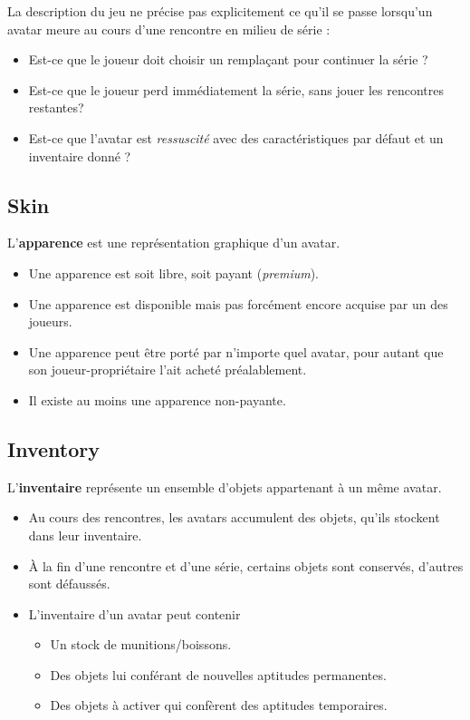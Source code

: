 \begin{tcolorbox}
    La description du jeu ne précise pas explicitement ce qu'il se passe lorsqu'un avatar meure au cours d'une rencontre en milieu de série :
    \begin{itemize}
        \item Est-ce que le joueur doit choisir un remplaçant pour continuer la série ?
        \item Est-ce que le joueur perd immédiatement la série, sans jouer les rencontres restantes\:?
        \item Est-ce que l'avatar est \textit{ressuscité} avec des caractéristiques par défaut et un inventaire donné ?
    \end{itemize}
\end{tcolorbox}
    
\subsection{Skin}
L'\textbf{apparence} est une représentation graphique d'un avatar.
    \begin{itemize}
        \item Une apparence est soit libre, soit payant (\textit{premium}).
        \item Une apparence est disponible mais pas forcément encore acquise par un des joueurs.
        \item Une apparence peut être porté par n'importe quel avatar, pour autant que son joueur-propriétaire l'ait acheté préalablement.
        \item Il existe au moins une apparence non-payante.
    \end{itemize}

\subsection{Inventory}
L'\textbf{inventaire} représente un ensemble d'objets appartenant à un même avatar.
    \begin{itemize}
        \item Au cours des rencontres, les avatars accumulent des objets, qu'ils stockent dans leur inventaire.
        \item À la fin d'une rencontre et d'une série, certains objets sont conservés, d'autres sont défaussés.
        \item L'inventaire d'un avatar peut contenir
            \begin{itemize}
                \item Un stock de munitions/boissons.
                \item Des objets lui conférant de nouvelles aptitudes permanentes.
                \item Des objets à activer qui confèrent des aptitudes temporaires.
            \end{itemize}
    \end{itemize}

